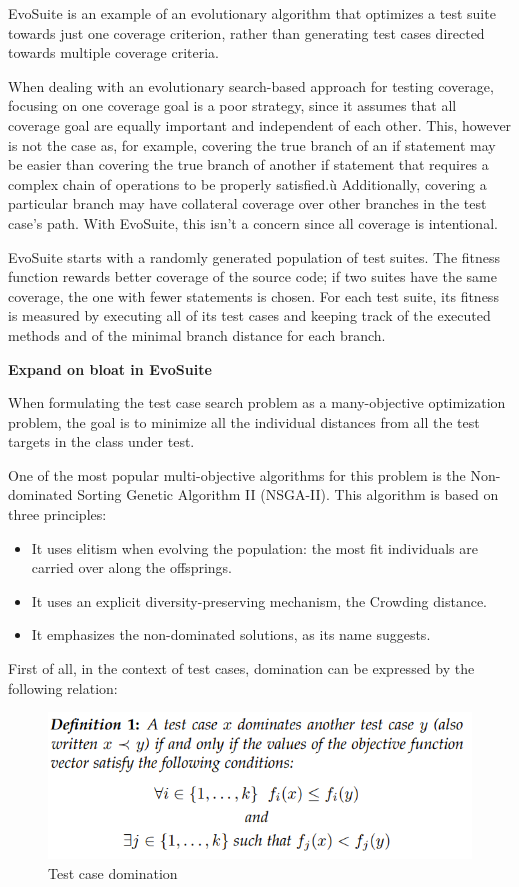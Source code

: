 EvoSuite is an example of an evolutionary algorithm that optimizes a test suite towards just one coverage criterion, rather than generating test cases directed towards multiple coverage criteria.

When dealing with an evolutionary search-based approach for testing coverage, focusing on one coverage goal is a poor strategy, since it assumes that all coverage goal are equally important and independent of each other. This, however is not the case as, for example, covering the true branch of an if statement may be easier than covering the true branch of another if statement that requires a complex chain of operations to be properly satisfied.ù
Additionally, covering a particular branch may have collateral coverage over other branches in the test case's path. With EvoSuite, this isn't a concern since all coverage is intentional.

EvoSuite starts with a randomly generated population of test suites.
The fitness function rewards better coverage of the source code; if two suites have the same coverage, the one with fewer statements is chosen. For each test suite, its fitness is measured by executing all of its test cases and keeping track of the executed methods and of the minimal branch distance for each branch.

\textbf{Expand on bloat in EvoSuite}




When formulating the test case search problem as a many-objective optimization problem, the goal is to minimize all the individual distances from all the test targets in the class under test.

One of the most popular multi-objective algorithms for this problem is the Non-dominated Sorting Genetic Algorithm II (NSGA-II). This algorithm is based on three principles:

\begin{itemize}
    \item It uses elitism when evolving the population: the most fit individuals are carried over along the offsprings.
    \item It uses an explicit diversity-preserving mechanism, the Crowding distance.
    \item It emphasizes the non-dominated solutions, as its name suggests.
\end{itemize}

First of all, in the context of test cases, domination can be expressed by the following relation:
\begin{figure}[h]
    \centering
    \includegraphics[scale=0.4]{./figures/test_Case_domination.PNG}
    \caption{Test case domination}
    \label{fig:test case domination}
\end{figure}



